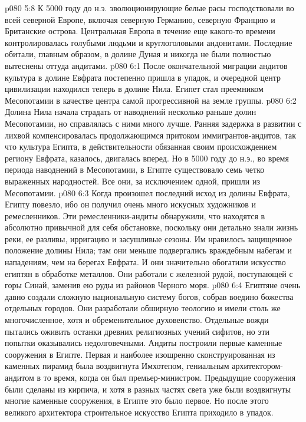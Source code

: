 \vs p080 5:8 \pc К 5000 году до н.э. эволюционирующие белые расы господствовали во всей северной Европе, включая северную Германию, северную Францию и Британские острова. Центральная Европа в течение еще какого\hyp{}то времени контролировалась голубыми людьми и круглоголовыми андонитами. Последние обитали, главным образом, в долине Дуная и никогда не были полностью вытеснены оттуда андитами.
\vs p080 6:1 После окончательной миграции андитов культура в долине Евфрата постепенно пришла в упадок, и очередной центр цивилизации находился теперь в долине Нила. Египет стал преемником Месопотамии в качестве центра самой прогрессивной на земле группы.
\vs p080 6:2 Долина Нила начала страдать от наводнений несколько раньше долин Месопотамии, но справлялась с ними много лучше. Ранняя задержка в развитии с лихвой компенсировалась продолжающимся притоком иммигрантов\hyp{}андитов, так что культура Египта, в действительности обязанная своим происхождением региону Евфрата, казалось, двигалась вперед. Но в 5000 году до н.э., во время периода наводнений в Месопотамии, в Египте существовало семь четко выраженных народностей. Все они, за исключением одной, пришли из Месопотамии.
\vs p080 6:3 \pc Когда произошел последний исход из долины Евфрата, Египту повезло, ибо он получил очень много искусных художников и ремесленников. Эти ремесленники\hyp{}андиты обнаружили, что находятся в абсолютно привычной для себя обстановке, поскольку они детально знали жизнь реки, ее разливы, ирригацию и засушливые сезоны. Им нравилось защищенное положение долины Нила; там они меньше подвергались враждебным набегам и нападениям, чем на берегах Евфрата. И они значительно обогатили искусство египтян в обработке металлов. Они работали с железной рудой, поступающей с горы Синай, заменив ею руды из районов Черного моря.
\vs p080 6:4 \pc Египтяне очень давно создали сложную национальную систему богов, собрав воедино божества отдельных городов. Они разработали обширную теологию и имели столь же многочисленное, хотя и обременительное духовенство. Отдельные вожди пытались оживить останки древних религиозных учений сифитов, но эти попытки оказывались недолговечными. Андиты построили первые каменные сооружения в Египте. Первая и наиболее изощренно сконструированная из каменных пирамид была воздвигнута Имхотепом, гениальным архитектором\hyp{}андитом в то время, когда он был премьер\hyp{}министром. Предыдущие сооружения были сделаны из кирпича, и хотя в разных частях света уже были воздвигнуты многие каменные сооружения, в Египте это было первое. Но после этого великого архитектора строительное искусство Египта приходило в упадок.

